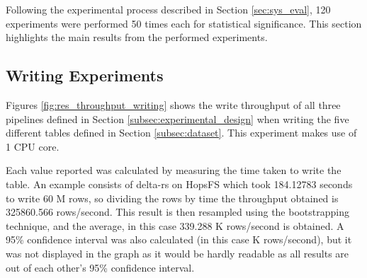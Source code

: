 Following the experimental process described in Section \ref{sec:sys_eval}, 120 experiments were performed 50 times each for statistical significance. This section highlights the main results from the performed experiments.

\subsection{Writing Experiments}

Figures \ref{fig:res_throughput_writing} shows the write throughput of all three pipelines defined in Section \ref{subsec:experimental_design} when writing the five different tables defined in Section \ref{subsec:dataset}. This experiment makes use of 1 \gls{CPU} core. 

Each value reported was calculated by measuring the time taken to write the table. An example consists of delta-rs on \gls{HopsFS} which took 184.12783 seconds to write 60 M rows, so dividing the rows by time the throughput obtained is 325860.566 rows/second. This result is then resampled using the bootstrapping technique, and the average, in this case 339.288 K rows/second is obtained. A 95\% confidence interval was also calculated (in this case  K rows/second), but it was not displayed in the graph as it would be hardly readable as all results are out of each other's 95\% confidence interval.

